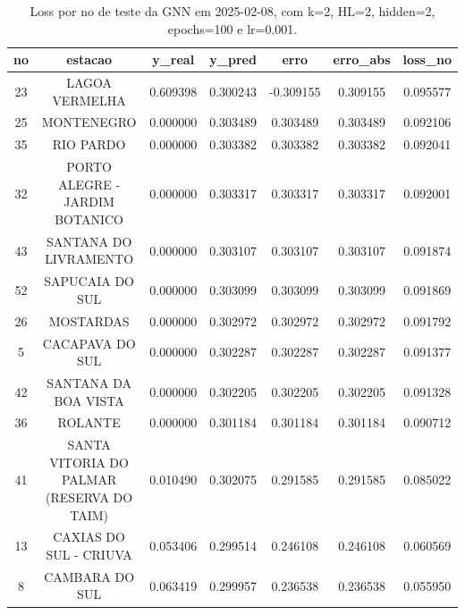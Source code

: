\begin{table}[h]
\centering
\caption{Loss por no de teste da GNN em 2025-02-08, com k=2, HL=2, hidden=2, epochs=100 e lr=0.001.}
\label{tab:gnn_loss_k2_hl2_h2_e100_d20250208}
\begin{tabular}{ccccccc}
\toprule
no & estacao & y\_real & y\_pred & erro & erro\_abs & loss\_no \\
\midrule
23 & LAGOA VERMELHA & 0.609398 & 0.300243 & -0.309155 & 0.309155 & 0.095577 \\
25 & MONTENEGRO & 0.000000 & 0.303489 & 0.303489 & 0.303489 & 0.092106 \\
35 & RIO PARDO & 0.000000 & 0.303382 & 0.303382 & 0.303382 & 0.092041 \\
32 & PORTO ALEGRE - JARDIM BOTANICO & 0.000000 & 0.303317 & 0.303317 & 0.303317 & 0.092001 \\
43 & SANTANA DO LIVRAMENTO & 0.000000 & 0.303107 & 0.303107 & 0.303107 & 0.091874 \\
52 & SAPUCAIA DO SUL & 0.000000 & 0.303099 & 0.303099 & 0.303099 & 0.091869 \\
26 & MOSTARDAS & 0.000000 & 0.302972 & 0.302972 & 0.302972 & 0.091792 \\
5 & CACAPAVA DO SUL & 0.000000 & 0.302287 & 0.302287 & 0.302287 & 0.091377 \\
42 & SANTANA DA BOA VISTA & 0.000000 & 0.302205 & 0.302205 & 0.302205 & 0.091328 \\
36 & ROLANTE & 0.000000 & 0.301184 & 0.301184 & 0.301184 & 0.090712 \\
41 & SANTA VITORIA DO PALMAR (RESERVA DO TAIM) & 0.010490 & 0.302075 & 0.291585 & 0.291585 & 0.085022 \\
13 & CAXIAS DO SUL - CRIUVA & 0.053406 & 0.299514 & 0.246108 & 0.246108 & 0.060569 \\
8 & CAMBARA DO SUL & 0.063419 & 0.299957 & 0.236538 & 0.236538 & 0.055950 \\
\bottomrule
\end{tabular}
\end{table}
